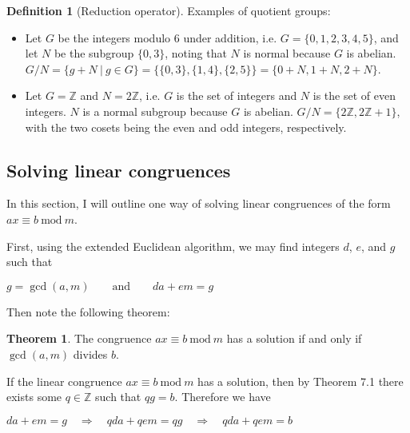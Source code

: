 \documentclass{article}
\theoremstyle{definition}
\newtheorem{definition}{Definition}[section]
\theoremstyle{theorem}
\newtheorem{theorem}{Theorem}[section]
\theoremstyle{example}
\theoremstyle{corollary}
\begin{document}
\begin{definition}[Reduction operator]
\bigskip

Examples of quotient groups:
\begin{itemize}
\item Let \(G\) be the integers modulo 6 under addition, i.e. \(G = \{ 0, 1, 2, 3, 4, 5 \}\), and let \(N\) be the subgroup \(\{ 0, 3 \}\), noting that \(N\) is normal because \(G\) is abelian. \(G/N = \{g + N \ | \ g \in G \} = \{ \{0,3\}, \{1,4\}, \{2,5\} \} = \{ 0 + N, 1 + N, 2 + N \}\).
\item Let \(G = \mathbb{Z}\) and \(N = 2\mathbb{Z}\), i.e. \(G\) is the set of integers and \(N\) is the set of even integers. \(N\) is a normal subgroup because \(G\) is abelian. \(G/N = \{ 2\mathbb{Z}, 2\mathbb{Z} + 1 \}\), with the two cosets being the even and odd integers, respectively.
\end{itemize}

\bigskip

\subsection{Solving linear congruences}

\bigskip

In this section, I will outline one way of solving linear congruences of the form \(ax \equiv b \ \textrm{mod} \ m\).

\bigskip

First, using the extended Euclidean algorithm, we may find integers \(d\), \(e\), and \(g\) such that
\begin{center}
\(g = \gcd(a, m) \quad \quad \textrm{and} \quad \quad da + em = g\)
\end{center}

\bigskip

Then note the following theorem:

\bigskip

\theoremstyle{theorem}
\begin{theorem}
The congruence \(ax \equiv b \ \textrm{mod} \ m\) has a solution if and only if \(\gcd(a, m)\) divides \(b\).
\end{theorem}

\bigskip

If the linear congruence \(ax \equiv b \ \textrm{mod} \ m\) has a solution, then by Theorem 7.1 there exists some \(q \in \mathbb{Z}\) such that \(qg = b\). Therefore we have
\begin{center}
\(da + em = g \quad \Rightarrow \quad qda + qem = qg \quad \Rightarrow \quad qda + qem = b\)
\end{center}


\end{definition}
\end{document}
